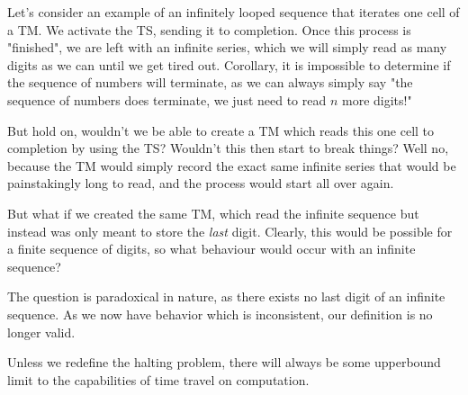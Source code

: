 \documentclass{report}
\begin{document}
Let's consider an example of an infinitely looped sequence that iterates one cell of a TM. We activate the TS, sending it to completion. Once this process is "finished", we are left with an infinite series, which we will simply read as many digits as we can until we get tired out. Corollary, it is impossible to determine if the sequence of numbers will terminate, as we can always simply say "the sequence of numbers does terminate, we just need to read $n$ more digits!"

But hold on, wouldn't we be able to create a TM which reads this one cell to completion by using the TS? Wouldn't this then start to break things? Well no, because the TM would simply record the exact same infinite series that would be painstakingly long to read, and the process would start all over again.

But what if we created the same TM, which read the infinite sequence but instead was only meant to store the \textit{last} digit. Clearly, this would be possible for a finite sequence of digits, so what behaviour would occur with an infinite sequence?

The question is paradoxical in nature, as there exists no last digit of an infinite sequence. As we now have behavior which is inconsistent, our definition is no longer valid.

Unless we redefine the halting problem, there will always be some upperbound limit to the capabilities of time travel on computation.



\end{document}
